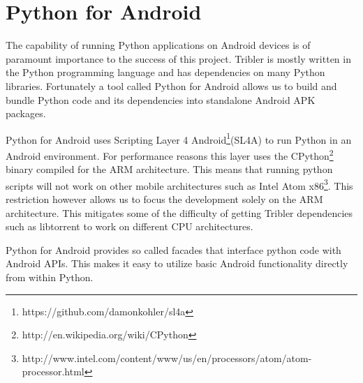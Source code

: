 \section{Python for Android}
	\label{sec:p4a}
	The capability of running Python applications on Android devices is of paramount importance to the success of this project. Tribler is mostly written in the Python programming language and has dependencies on many Python libraries. Fortunately a tool called Python for Android allows us to build and bundle Python code and its dependencies into standalone Android APK packages.

	Python for Android uses Scripting Layer 4 Android\footnote{https://github.com/damonkohler/sl4a}(SL4A) to run Python in an Android environment. For performance reasons this layer uses the CPython\footnote{http://en.wikipedia.org/wiki/CPython} binary compiled for the ARM architecture. This means that running python scripts will not work on other mobile architectures such as Intel Atom x86\footnote{http://www.intel.com/content/www/us/en/processors/atom/atom-processor.html}. This restriction however allows us to focus the development solely on the ARM architecture. This mitigates some of the difficulty of getting Tribler dependencies such as libtorrent to work on different CPU architectures.

	Python for Android provides so called facades that interface python code with Android APIs. This makes it easy to utilize basic Android functionality directly from within Python.
